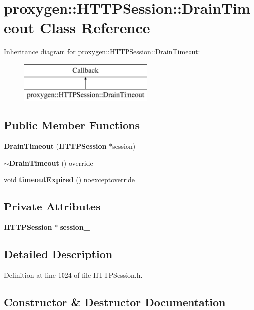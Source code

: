 \section{proxygen\+:\+:H\+T\+T\+P\+Session\+:\+:Drain\+Timeout Class Reference}
\label{classproxygen_1_1HTTPSession_1_1DrainTimeout}
Inheritance diagram for proxygen\+:\+:H\+T\+T\+P\+Session\+:\+:Drain\+Timeout\+:\begin{figure}[H]
\begin{center}
\leavevmode
\includegraphics[height=2.000000cm]{classproxygen_1_1HTTPSession_1_1DrainTimeout}
\end{center}
\end{figure}
\subsection*{Public Member Functions}
\begin{DoxyCompactItemize}
\item 
{\bf Drain\+Timeout} ({\bf H\+T\+T\+P\+Session} $\ast$session)
\item 
{\bf $\sim$\+Drain\+Timeout} () override
\item 
void {\bf timeout\+Expired} () noexceptoverride
\end{DoxyCompactItemize}
\subsection*{Private Attributes}
\begin{DoxyCompactItemize}
\item 
{\bf H\+T\+T\+P\+Session} $\ast$ {\bf session\+\_\+}
\end{DoxyCompactItemize}


\subsection{Detailed Description}


Definition at line 1024 of file H\+T\+T\+P\+Session.\+h.



\subsection{Constructor \& Destructor Documentation}
